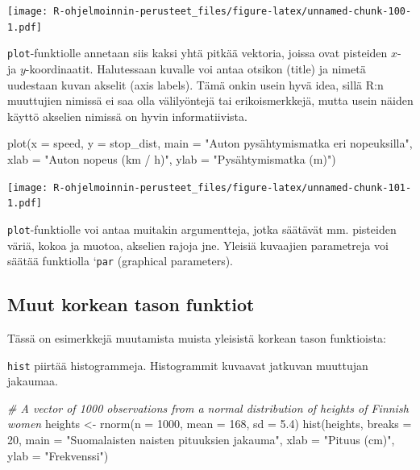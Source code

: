 \documentclass[
]{book}
\newenvironment{Shaded}{\begin{snugshade}}{\end{snugshade}}
\newcommand{\AttributeTok}[1]{\textcolor[rgb]{0.77,0.63,0.00}{#1}}
\newcommand{\CommentTok}[1]{\textcolor[rgb]{0.56,0.35,0.01}{\textit{#1}}}
\newcommand{\DecValTok}[1]{\textcolor[rgb]{0.00,0.00,0.81}{#1}}
\newcommand{\FloatTok}[1]{\textcolor[rgb]{0.00,0.00,0.81}{#1}}
\newcommand{\FunctionTok}[1]{\textcolor[rgb]{0.00,0.00,0.00}{#1}}
\newcommand{\NormalTok}[1]{#1}
\newcommand{\OtherTok}[1]{\textcolor[rgb]{0.56,0.35,0.01}{#1}}
\newcommand{\StringTok}[1]{\textcolor[rgb]{0.31,0.60,0.02}{#1}}
\begin{document}
\texttt{[image: R-ohjelmoinnin-perusteet\_files/figure-latex/unnamed-chunk-100-1.pdf]}

\texttt{plot}-funktiolle annetaan siis kaksi yhtä pitkää vektoria, joissa ovat pisteiden \(x\)- ja \(y\)-koordinaatit. Halutessaan kuvalle voi antaa otsikon (title) ja nimetä uudestaan kuvan akselit (axis labels). Tämä onkin usein hyvä idea, sillä R:n muuttujien nimissä ei saa olla välilyöntejä tai erikoismerkkejä, mutta usein näiden käyttö akselien nimissä on hyvin informatiivista.

\begin{Shaded}
\begin{Highlighting}[]
\FunctionTok{plot}\NormalTok{(}\AttributeTok{x =}\NormalTok{ speed, }\AttributeTok{y =}\NormalTok{ stop\_dist,}
     \AttributeTok{main =} \StringTok{"Auton pysähtymismatka eri nopeuksilla"}\NormalTok{,}
     \AttributeTok{xlab =} \StringTok{"Auton nopeus (km / h)"}\NormalTok{, }\AttributeTok{ylab =} \StringTok{"Pysähtymismatka (m)"}\NormalTok{)}
\end{Highlighting}
\end{Shaded}

\texttt{[image: R-ohjelmoinnin-perusteet\_files/figure-latex/unnamed-chunk-101-1.pdf]}

\texttt{plot}-funktiolle voi antaa muitakin argumentteja, jotka säätävät mm. pisteiden väriä, kokoa ja muotoa, akselien rajoja jne. Yleisiä kuvaajien parametreja voi säätää funktiolla `\texttt{par} (graphical parameters).

\hypertarget{muut-korkean-tason-funktiot}{%
\subsection{Muut korkean tason funktiot}\label{muut-korkean-tason-funktiot}}

Tässä on esimerkkejä muutamista muista yleisistä korkean tason funktioista:

\texttt{hist} piirtää histogrammeja. Histogrammit kuvaavat jatkuvan muuttujan jakaumaa.

\begin{Shaded}
\begin{Highlighting}[]
\CommentTok{\# A vector of 1000 observations from a normal distribution of heights of Finnish women}
\NormalTok{heights }\OtherTok{\textless{}{-}} \FunctionTok{rnorm}\NormalTok{(}\AttributeTok{n =} \DecValTok{1000}\NormalTok{, }\AttributeTok{mean =} \DecValTok{168}\NormalTok{, }\AttributeTok{sd =} \FloatTok{5.4}\NormalTok{)}
\FunctionTok{hist}\NormalTok{(heights, }\AttributeTok{breaks =} \DecValTok{20}\NormalTok{, }
     \AttributeTok{main =} \StringTok{"Suomalaisten naisten pituuksien jakauma"}\NormalTok{,}
     \AttributeTok{xlab =} \StringTok{"Pituus (cm)"}\NormalTok{, }\AttributeTok{ylab =} \StringTok{"Frekvenssi"}\NormalTok{)}
\end{Highlighting}
\end{Shaded}
\end{document}
